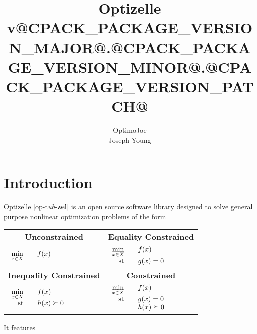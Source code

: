 \documentclass{report}
\title{Optizelle v@CPACK_PACKAGE_VERSION_MAJOR@.@CPACK_PACKAGE_VERSION_MINOR@.@CPACK_PACKAGE_VERSION_PATCH@}
\author{OptimoJoe\\Joseph Young}
\newcommand{\st}{\textnormal{st}}
\newcommand{\unconstrained}{\begin{array}[t]{rcl}\min\limits_{x\in X}&& f(x)\end{array}}
\newcommand{\equalityConstrained}{\begin{array}[t]{rcl}\min\limits_{x\in X}&&f(x)\\\st && g(x)=0\end{array}}
\newcommand{\inequalityConstrained}{\begin{array}[t]{rcl}\min\limits_{x\in X}&&f(x)\\\st && h(x)\succeq 0\end{array}}
\newcommand{\constrained}{\begin{array}[t]{rcl}\min\limits_{x\in X}&&f(x)\\\st && g(x)=0\\&&h(x)\succeq 0\end{array}}
\begin{document}
\maketitle
\tableofcontents

\chapter{Introduction}\label{ch:Introduction}

        Optizelle [op-t\textit{\!uh}-{\bf zel}] is an open source software library designed to solve general purpose nonlinear optimization problems of the form
        \begin{center}\begin{tabular}{|l|l|}\hline
        \multicolumn{1}{|c|}{\bf Unconstrained} &
        \multicolumn{1}{c|}{\bf Equality Constrained}\\
        $\unconstrained$ &
        $\equalityConstrained$ \\\hline
        \multicolumn{1}{|c|}{\bf Inequality Constrained} &
        \multicolumn{1}{c|}{\bf Constrained}\\
        $\inequalityConstrained$ &
        $\constrained$ \\\hline
        \end{tabular}\end{center}
It features 
\end{document}
